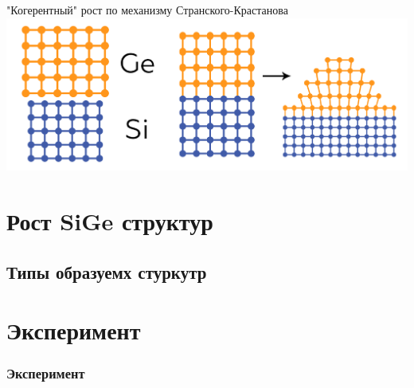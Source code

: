 \documentclass[10pt,pdf,hyperref={unicode}, dvipsnames]{beamer}
\begin{document}
\begin{frame}[t]
\begin{minipage}{0.84\linewidth}
		"Когерентный" рост по механизму Странского-Крастанова
		\includegraphics[width = \linewidth]{imgs/2st.png}
		
	\end{minipage}
	\vfill
\end{frame}

\section{Рост SiGe структур}
\subsection{Типы образуемх стуркутр}
\begin{frame}[t]
	\frametitle{}
	
\end{frame}

\section{Эксперимент}
\begin{frame}[t]
	\frametitle{Эксперимент}
\end{frame}
\end{document}
